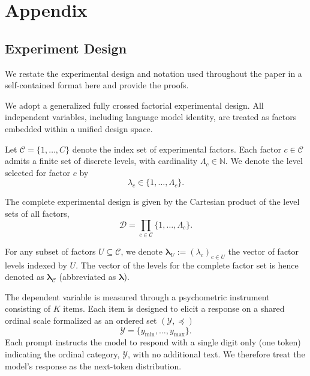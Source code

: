 \section{Appendix}
\label{sec:appendix}

\subsection{Experiment Design}
\label{app:experiment-design}

We restate the experimental design and notation used throughout the paper
in a self-contained format here and provide the proofs.

We adopt a generalized fully crossed factorial experimental design.
All independent variables, including language model identity, are treated as factors embedded within a unified design space.

Let $\mathcal{C} = \{1,\dots,C\}$ denote the index set of experimental factors.
Each factor $c \in \mathcal{C}$ admits a finite set of discrete levels, with cardinality $\Lambda_c \in \mathbb{N}$.
We denote the level selected for factor $c$ by
\[
\lambda_c \in \{1,\dots,\Lambda_c\}.
\]
 
The complete experimental design is given by the Cartesian product of the level sets of all factors,
\begin{equation}
\label{eq:design-space}
\mathcal{D}
=
\prod_{c \in \mathcal{C}}
\{1,\dots,\Lambda_c\}.
\end{equation}

For any subset of factors $U \subseteq \mathcal{C}$, we denote
$\boldsymbol{\lambda}_U := (\lambda_c)_{c \in U}$ the vector of factor levels
indexed by $U$.
The vector of the levels for the complete factor set is hence denoted as 
$\boldsymbol{\lambda}_{\mathcal{C}}$ 
(abbreviated as
$\boldsymbol{\lambda}$).



The dependent variable is measured through a psychometric instrument consisting of $K$ items. 
Each item is designed to elicit a response on a shared ordinal scale formalized as an ordered set $(\mathcal{Y}, \preceq)$
\begin{equation}
    \label{eq:Y-support}
    \mathcal{Y} = \{y_{\min}, \dots, y_{\max}\} .
\end{equation}
Each prompt instructs the model to respond with a single digit only (one token) indicating the ordinal category, $\mathcal{Y}$, with no additional text. We therefore treat the model's response as the next-token distribution.

